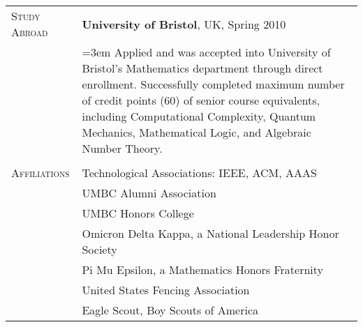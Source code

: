 \begin{tabular}{l p{340pt}}
\textsc{Study Abroad} & \textbf{University of Bristol}, UK, Spring 2010\\
& \hangindent=3em \hangafter=0  Applied and was accepted into University of Bristol's Mathematics department through direct enrollment.  Successfully completed maximum number of credit points (60) of senior course equivalents, including Computational Complexity, Quantum Mechanics, Mathematical Logic, and Algebraic Number Theory.\\
& \\


\textsc{Affiliations}
& Technological Associations: IEEE, ACM, AAAS\\
& UMBC Alumni Association\\
& UMBC Honors College\\
& Omicron Delta Kappa, a National Leadership Honor Society\\
& Pi Mu Epsilon, a Mathematics Honors Fraternity\\
& United States Fencing Association\\
& Eagle Scout, Boy Scouts of America\\
\end{tabular}
